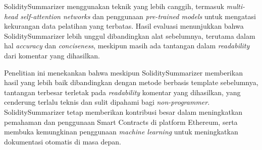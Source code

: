 SoliditySummarizer menggunakan teknik yang lebih canggih, termasuk \textit{multi-head self-attention networks} dan penggunaan \textit{pre-trained models} untuk mengatasi kekurangan data pelatihan yang terbatas. Hasil evaluasi menunjukkan bahwa SoliditySummarizer lebih unggul dibandingkan alat sebelumnya, terutama dalam hal \textit{accuracy} dan \textit{conciseness}, meskipun masih ada tantangan dalam \textit{readability} dari komentar yang dihasilkan.

Penelitian ini menekankan bahwa meskipun SoliditySummarizer memberikan hasil yang lebih baik dibandingkan dengan metode berbasis template sebelumnya, tantangan terbesar terletak pada \textit{readability} komentar yang dihasilkan, yang cenderung terlalu teknis dan sulit dipahami bagi \textit{non-programmer}. SoliditySummarizer tetap memberikan kontribusi besar dalam meningkatkan pemahaman dan penggunaan Smart Contracts di platform Ethereum, serta membuka kemungkinan penggunaan \textit{machine learning} untuk meningkatkan dokumentasi otomatis di masa depan.